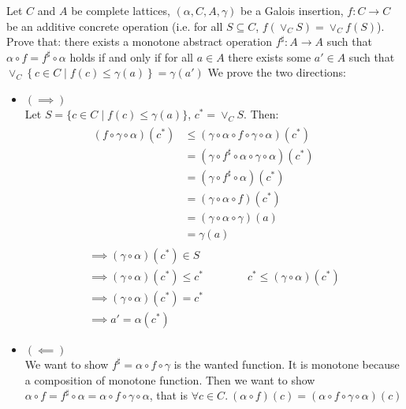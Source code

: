 \begin{exercise}{
    Let $C$ and $A$ be complete lattices, $(\alpha, C, A, \gamma)$ be a Galois insertion, $f: C \to C$ be an additive concrete operation (i.e. for all $S \subseteq C$, $f(\vee_C S) = \vee_C f(S)$). Prove that: there exists a monotone abstract operation $f^\sharp: A \to A$ such that $\alpha \circ f = f^\sharp \circ \alpha$ holds if and only if for all $a \in A$ there exists some $a' \in A$ such that $\vee_C \left\{ c \in C \mid f(c) \leq \gamma(a) \right\} = \gamma(a')$
}
    We prove the two directions:
    \begin{itemize}
        \item $(\implies)$ \\
        Let $S = \{c \in C \mid f(c) \leq \gamma(a)\}$, $c^* = \vee_C S$. Then:
        \begin{gather*}
            \begin{aligned}
                (f \circ \gamma \circ \alpha) (c^*)
                &\leq (\gamma \circ \alpha \circ f \circ \gamma \circ \alpha) (c^*) \\
                &= (\gamma \circ f^\sharp \circ \alpha \circ \gamma \circ \alpha) (c^*) \\
                &= (\gamma \circ f^\sharp \circ \alpha) (c^*) \\
                &= (\gamma \circ \alpha \circ f) (c^*) \\
                &= (\gamma \circ \alpha \circ \gamma) (a) \\
                &= \gamma (a)
            \end{aligned} \\
            \implies (\gamma \circ \alpha) (c^*) \in S \\
            \implies (\gamma \circ \alpha) (c^*) \leq c^* \qquad\qquad c^* \leq (\gamma \circ \alpha) (c^*) \\
            \implies (\gamma \circ \alpha) (c^*) = c^* \\
            \implies a' = \alpha(c^*)
        \end{gather*}
        \item $(\impliedby)$ \\
        We want to show $f^\sharp = \alpha \circ f \circ \gamma$ is the wanted function. It is monotone because a composition of monotone function. Then we want to show $\alpha \circ f = f^\sharp \circ \alpha = \alpha \circ f \circ \gamma \circ \alpha$, that is $\forall c \in C.\ (\alpha \circ f)(c) = (\alpha \circ f \circ \gamma \circ \alpha)(c)$ \\

\end{itemize}
\end{exercise}
